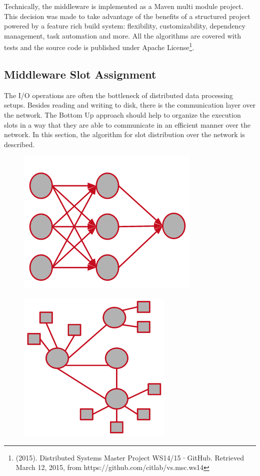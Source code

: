 Technically, the middleware is implemented as a Maven multi module project. This decision was made
to take advantage of the benefits of a structured project powered by a feature rich build system:
flexibility, customizability, dependency management, task automation and more. All the algorithms
are covered with tests and the source code is published under Apache License\footnote{(2015).
Distributed Systems Master Project WS14/15 ∙ GitHub. Retrieved March 12, 2015, from
https://github.com/citlab/vs.msc.ws14}.

\subsection{Middleware Slot Assignment}
The I/O operations are often the bottleneck of distributed data processing setups\cite{cheating}. Besides
reading and writing to disk, there is the communication layer over the network. The Bottom Up
approach should help to organize the execution slots in a way that they are able to communicate in an
efficient manner over the network. In this section, the algorithm for  slot distribution over the
network is described.

\begin{figure}[h]
    \centering
    \begin{minipage}{0.5\textwidth}
        \centering
        \includegraphics[width=0.6\linewidth]{graphics/executiongraph.png}
        \label{fig:execution_graph}
    \end{minipage}%
    \begin{minipage}{0.5\textwidth}
        \centering
        \includegraphics[width=0.6\linewidth]{graphics/topology.png}
        \label{fig:network_topology}
    \end{minipage}
\end{figure}

